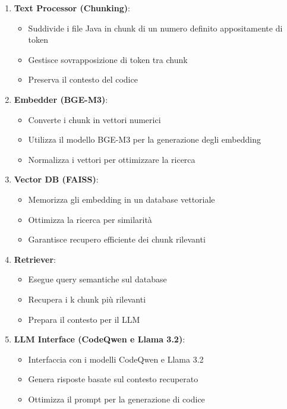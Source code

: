\documentclass[12pt,a4paper,openright,twoside]{book}
\begin{document}
\begin{enumerate}
    \item \textbf{Text Processor (Chunking)}:
    \begin{itemize}
        \item Suddivide i file Java in chunk di un numero definito appositamente di token
        \item Gestisce sovrapposizione di token tra chunk
        \item Preserva il contesto del codice
    \end{itemize}

    \item \textbf{Embedder (BGE-M3)}:
    \begin{itemize}
        \item Converte i chunk in vettori numerici
        \item Utilizza il modello BGE-M3 per la generazione degli embedding
        \item Normalizza i vettori per ottimizzare la ricerca
    \end{itemize}

    \item \textbf{Vector DB (FAISS)}:
    \begin{itemize}
        \item Memorizza gli embedding in un database vettoriale
        \item Ottimizza la ricerca per similarità
        \item Garantisce recupero efficiente dei chunk rilevanti
    \end{itemize}

    \item \textbf{Retriever}:
    \begin{itemize}
        \item Esegue query semantiche sul database
        \item Recupera i k chunk più rilevanti
        \item Prepara il contesto per il LLM
    \end{itemize}

    \item \textbf{LLM Interface (CodeQwen e Llama 3.2)}:
    \begin{itemize}
        \item Interfaccia con i modelli CodeQwen e Llama 3.2
        \item Genera risposte basate sul contesto recuperato
        \item Ottimizza il prompt per la generazione di codice
    \end{itemize}
\end{enumerate}
\end{document}
